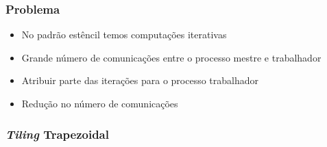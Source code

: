 \documentclass[xcolor={table}]{beamer}
\begin{document}
\begin{frame}\frametitle{Problema}
    \begin{itemize}
        \item {No padrão estêncil temos computações iterativas}
        \item {Grande número de comunicações entre o processo mestre e trabalhador}
        \item {Atribuir parte das iterações para o processo trabalhador}
        \item {Redução no número de comunicações}
    \end{itemize}
\end{frame}

\begin{frame}\frametitle{\textit{Tiling} Trapezoidal}
    \begin{flushleft}

\end{flushleft}
\end{frame}
\end{document}

